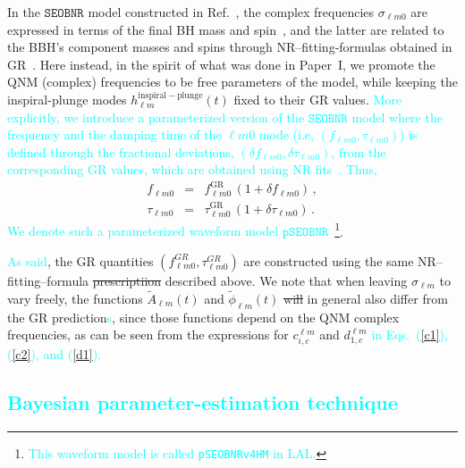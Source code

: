 \documentclass[twocolumn,prd,aps,superscriptaddress,preprintnumbers,tightenlines,showpacs,nofootinbib,eqsecnum,amsfonts,amsmath]{revtex4-1}
\newcommand{\paperone}{Paper~I\xspace}
\newcommand{\ab}[1]{\textcolor{cyan}{#1}}
\newcommand{\pSEOB}{\texttt{pSEOBNR}}
\newcommand{\SEOB}{\texttt{SEOBNR}}
\begin{document}
In the $\SEOB$ model constructed in Ref.~\cite{Cotesta:2018fcv}, the
complex frequencies $\sigma_{\ell m 0}$ are expressed in terms of the
final BH mass and spin~\cite{Berti:2005ys,Berti:2009kk}, and the
latter are related to the BBH's component masses and spins through
NR--fitting-formulas obtained in
GR~\cite{Taracchini:2013rva,Hofmann:2016yih}. Here instead, in the
spirit of what was done in \paperone, we promote the QNM (complex)
frequencies to be free parameters of the model, while keeping the
inspiral-plunge modes $h_{\ell m}^\mathrm{inspiral-plunge}(t)$ fixed
to their GR values. \ab{More explicitly, we introduce a parameterized 
version of the $\SEOB$ model where the frequency and the
damping time of the ${\ell m 0}$ mode (i.e, $(f_{\ell m 0}, \tau
_{\ell m 0})$) is defined through the fractional deviations, $(\delta
f_{\ell m 0},\delta \tau_{\ell m 0})$, from the corresponding GR
values, which are obtained using NR fits~\cite{Taracchini:2013rva,Hofmann:2016yih}. Thus,} 
\begin{eqnarray}
f_{\ell m 0} &=& f_{\ell m 0}^{\text{GR}}\, (1 + \delta f_{\ell m 0})\,,\label{eq:nongr_freqs_a} \\ 
\tau _{\ell m 0} &=& \tau _{\ell m 0}^{\text{GR}}\, (1 + \delta \tau_{\ell m 0})\,. \label{eq:nongr_freqs_b}
\end{eqnarray}
\ab{We denote such a parameterized waveform model $\pSEOB$}~\footnote{\ab{This 
waveform model is called {\tt pSEOBNRv4HM} in LAL.}}.

\ab{As said}, the GR quantities $( f_{\ell m 0}^{GR},\tau_{\ell m 0}^{GR})$ are
constructed using the same NR--fitting--formula \sout{prescriptiion} 
described above. We note that when leaving $\sigma_{\ell m}$ to vary
freely, the functions $\tilde{A}_{\ell m}(t)$ and $\tilde{\phi}_{\ell
  m}(t)$ \sout{will} in general also differ from the GR prediction\ab{s}, since
those functions depend on the QNM complex frequencies, as can be seen
from the expressions for $c_{i,c}^{\ell m}$ and $d_{1,c}^{\ell m}$ \ab{in Eqs.~(\ref{c1}), 
(\ref{c2}), and (\ref{d1}).}


\ab{\subsection{Bayesian parameter-estimation technique}}
\label{sec:method}
\end{document}

